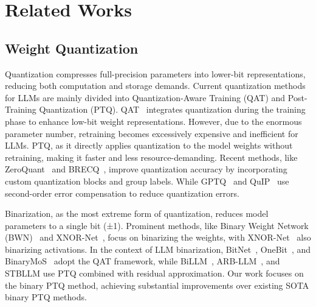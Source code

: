 \section{Related Works}
\subsection{Weight Quantization}
Quantization compresses full-precision parameters into lower-bit representations, reducing both computation and storage demands. Current quantization methods for LLMs are mainly divided into Quantization-Aware Training (QAT) and Post-Training Quantization (PTQ). QAT~\cite{liu2023llm,chen2024db,du2024bitdistiller} integrates quantization during the training phase to enhance low-bit weight representations. However, due to the enormous parameter number, retraining becomes excessively expensive and inefficient for LLMs. PTQ, as it directly applies quantization to the model weights without retraining, making it faster and less resource-demanding. Recent methods, like ZeroQuant~\cite{yao2022zeroquant} and BRECQ~\cite{li2021brecq}, improve quantization accuracy by incorporating custom quantization blocks and group labels. While GPTQ~\cite{frantar2022gptq} and QuIP~\cite{chee2024quip} use second-order error compensation to reduce quantization errors. 

Binarization, as the most extreme form of quantization, reduces model parameters to a single bit (±1). Prominent methods, like Binary Weight Network (BWN)~\cite{rastegari2016xnor} and XNOR-Net~\cite{rastegari2016xnor}, focus on binarizing the weights, with XNOR-Net~\cite{rastegari2016xnor} also binarizing activations. In the context of LLM binarization, BitNet~\cite{wang2023bitnet}, OneBit~\citep{xu2024onebit}, and BinaryMoS~\cite{jo2024mixture} adopt the QAT framework, while BiLLM~\cite{huang2024billm}, ARB-LLM~\cite{li2024arb}, and STBLLM\cite{dong2024stbllm} use PTQ combined with residual approximation. Our work focuses on the binary PTQ method, achieving substantial improvements over existing SOTA binary PTQ methods.
\vspace{1mm}

